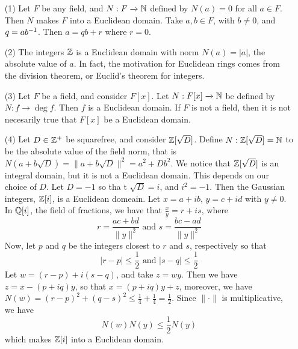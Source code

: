\begin{example}\label{example_6.1}
  \begin{enumerate}
    \item[(1)] Let $F$ be any field, and  $N:F \xrightarrow{} \mathbb{N}$ defined by
      $N(a)=0$ for all $a \in F$. Then  $N$ makes  $F$ into a Euclidean
      domain. Take  $a,b \in F$, with  $b \neq 0$, and  $q=ab^{-1}$. Then
      $a=qb+r$ where  $r=0$.

    \item[(2)] The integers $\mathbb{Z}$ is a Euclidean domain with norm $N(a)=|a|$,
      the absolute value of $a$. In fact, the motivation for Euclidean
      rings comes from the division theorem, or Euclid's theorem for
      integers.

    \item[(3)] Let $F$ be a field, and consider  $F[x]$. Let $N:F[x]
      \xrightarrow{} \mathbb{N}$ be defined by $N:f \xrightarrow{} \deg{f}$. Then
      $f$ is a Euclidean domain. If  $F$ is not a field, then it is not
      necesarily true that $F[x]$ be a Euclidean domain.

    \item[(4)] Let $D \in \mathbb{Z}^+$ be squarefree, and consider  $\mathbb{Z}[\sqrt{D}]$.
      Define $N:\mathbb{Z}[\sqrt{D}]=\mathbb{N}$ to be the absolute value of the field
      norm, that is $N(a+b\sqrt{D})=\|a+b\sqrt{D}\|^2=a^2+Db^2$. We notice
      that $\mathbb{Z}[\sqrt{D}]$ is an integral domain, but it is not a Euclidean
      domain. This depends on our choice of $D$. Let  $D=-1$ so tha t
      $\sqrt{D}=i$, and $i^2=-1$. Then the Gaussian integers, $\mathbb{Z}[i]$, is
      a Euclidean domeain. Let $x=a+ib$,  $y=c+id$ with  $y \neq 0$. In
      $\mathbb{Q}[i]$, the field of fractions, we have that $\frac{x}{y}=r+is$,
      where
      \begin{equation*}
        r=\frac{ac+bd}{\|y\|^2} \text{ and } s=\frac{bc-ad}{\|y\|^2}
      \end{equation*}
      Now, let $p$ and  $q$ be the integers closest to $r$ and $s$,
      respectively so that
      \begin{equation*}
        |r-p| \leq \frac{1}{2} \text{ and } |s-q| \leq \frac{1}{2}
      \end{equation*}
      Let $w=(r-p)+i(s-q)$, and take $z=wy$. Then we have  $z=x-(p+iq)y$,
      so that $x=(p+iq)y+z$, moreover, we have $N(w)=(r-p)^2+(q-s)^2 \leq
      \frac{1}{4}+\frac{1}{4}=\frac{1}{2}$. Since $\|\cdot\|$ is
      multiplicative, we have
      \begin{equation*}
        N(w)N(y) \leq \frac{1}{2}N(y)
      \end{equation*}
      which makes $\mathbb{Z}[i]$ into a Euclidean domain.


\end{enumerate}
\end{example}
